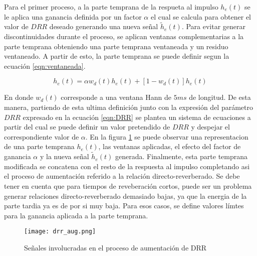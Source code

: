 Para el primer proceso, a la parte temprana de la respueta al impulso $h_{e}(t)$ se le aplica una ganancia definida por un factor $\alpha$ el cual se calcula para obtener el valor de $DRR$ deseado generando una nueva señal $\tilde{h}_{e}(t)$. Para evitar generar discontinuidades durante el proceso, se aplican ventanas complementarias a la parte temprana obteniendo una parte temprana ventaneada y un residuo ventaneado. A partir de esto, la parte temprana se puede definir segun la ecuación
\ref{eqn:ventaneada}.  

\begin{equation}
\label{eqn:ventaneada}
	h_{e}(t) = \alpha w_{d}(t)h_{e}(t) + [1-w_{d}(t)]h_{e}(t)
\end{equation} 

En donde $w_{d}(t)$ corresponde a una ventana Hann de $5 ms$ de longitud. De esta manera, partiendo de esta ultima definición junto con la expresión del parámetro $DRR$ expresado en la ecuación \ref{eqn:DRR} se plantea un sistema de ecuaciones a partir del cual se puede definir un valor pretendido de $DRR$ y despejar el correspondiente valor de $\alpha$. En la figura \ref{fig:drr_aug} se puede observar una representacion de una parte temprana $h_{e}(t)$, las ventanas aplicadas, el efecto del factor de ganancia $\alpha$ y la nueva señal $\tilde{h}_{e}(t)$ generada. Finalmente, esta parte temprana modificada se concatena con el resto de la respuesta al impulso completando asi el proceso de aumentación referido a la relación directo-reverberado. Se debe tener en cuenta que para tiempos de reveberación cortos, puede ser un problema generar relaciones directo-reverberado demasiado bajas, ya que la energia de la parte tardia ya es de por si muy baja. Para esos casos, se define valores límtes para la ganancia aplicada a la parte temprana.

\begin{figure}[H]
	\centering{}
	\texttt{[image: drr\_aug.png]}
	\caption{Señales involucradas en el proceso de aumentación de DRR}
	\label{fig:drr_aug}
\end{figure}

